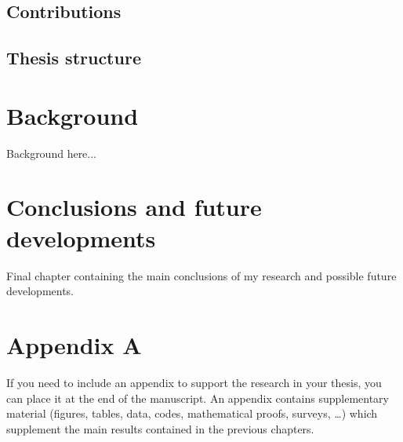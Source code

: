 \documentclass{Configuration_Files/PoliMi3i_thesis}
\begin{document}
    \section{Contributions}


    \section{Thesis structure}





    \chapter{Background}
    \label{ch:chapter_one}%

    Background here...


    \chapter{Conclusions and future developments}
    \label{ch:conclusions}%
    Final chapter containing the main conclusions of my research
    and possible future developments.




    \cleardoublepage
    \appendix


    \chapter{Appendix A}
    If you need to include an appendix to support the research in your thesis, you can place it at the end of the manuscript.
    An appendix contains supplementary material (figures, tables, data, codes, mathematical proofs, surveys, \dots)
    which supplement the main results contained in the previous chapters.
\end{document}
